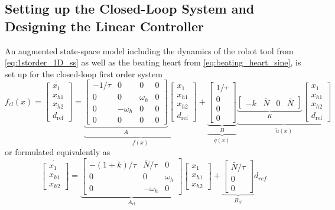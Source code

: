 \subsection{Setting up the Closed-Loop System and Designing the Linear Controller}
An augmented state-space model including the dynamics of the robot tool from \autoref{eq:1storder_1D_ss} as well as the beating heart from \autoref{eq:beating_heart_sine}, is set up for the closed-loop first order system
\begin{equation}
f_{cl}(x)=\dot{\begin{bmatrix}
	x_1\\x_{h1}\\x_{h2}\\d_\text{ref}
	\end{bmatrix}} =
\underbrace{\underbrace{\begin{bmatrix}
		-1/\tau & 0 & 0 & 0\\0 & 0 & \omega_h & 0 \\ 0 & -\omega_h & 0 & 0 \\ 0& 0 & 0 & 0
		\end{bmatrix}}_{A}
	\begin{bmatrix}
	x_1\\x_{h1}\\x_{h2}\\d_\text{ref}
	\end{bmatrix}}_{f(x)}+ 
\underbrace{\underbrace{\begin{bmatrix}
		1/\tau \\ 0 \\ 0 \\ 0
		\end{bmatrix}}_{B}}_{g(x)}
\underbrace{\underbrace{\begin{bmatrix}
		-k & \bar{N} & 0 & \bar{N}
		\end{bmatrix}}_{K}
	\begin{bmatrix}
	x_1\\x_{h1}\\x_{h2}\\d_\text{ref}
	\end{bmatrix}}_{\tilde{u}(x)}
\end{equation}
or formulated equivalently as
\begin{equation}
\dot{\begin{bmatrix}
	x_1\\x_{h1}\\x_{h2}
	\end{bmatrix}} =
\underbrace{\begin{bmatrix}
	-(1+k)/\tau & \bar{N}/\tau & 0\\0 & 0 & \omega_h \\ 0 & -\omega_h & 0
	\end{bmatrix}}_{A_{cl}}
\begin{bmatrix}
x_1\\x_{h1}\\x_{h2}
\end{bmatrix}+ 
\underbrace{\begin{bmatrix}
	\bar{N}/\tau \\ 0 \\ 0
	\end{bmatrix}}_{B_{cl}}
d_{ref}
\end{equation}
